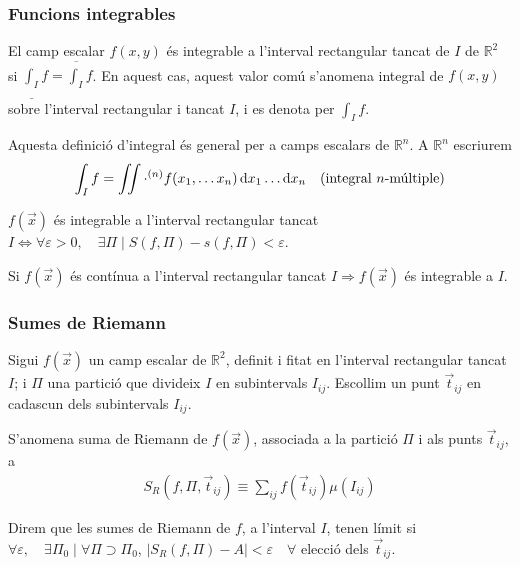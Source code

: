 \subsubsection*{Funcions integrables}
El camp escalar $f(x,y)$ és integrable a l'interval rectangular tancat de $I$ de $\mathbb{R}^{2}$ si $\displaystyle \underline{\int_{I}} f = \overline{\int_{I}} f$. En aquest cas, aquest valor comú s'anomena integral de $f(x,y)$ sobre l'interval rectangular i tancat $I$, i es denota per $\displaystyle \int_{I} f$.

Aquesta definició d'integral és general per a camps escalars de $\mathbb{R}^{n}$. A $\mathbb{R}^{n}$ escriurem
\begin{align}
	\int_{I} f = \iint \cdot^{(n)} f(x_{1}, \dots x_{n}) \mathop{}\!\mathrm{d} x_{1} \dots \mathrm{d} x_{n} \quad \text{(integral $n$-múltiple)}
\end{align}
\begin{thm}
	$f(\vec{x})$ és integrable a l'interval rectangular tancat $I \Leftrightarrow \forall \varepsilon >0, \quad \exists \Pi \mid S(f, \Pi) - s(f, \Pi) < \varepsilon$.
\end{thm}
\begin{cor}
	Si $f(\vec{x})$ és contínua a l'interval rectangular tancat $I \Rightarrow f(\vec{x})$ és integrable a $I$.
\end{cor}

\subsubsection*{Sumes de Riemann}
\begin{defi}
	Sigui $f(\vec{x})$ un camp escalar de $\mathbb{R}^{2}$, definit i fitat en l'interval rectangular tancat $I$; i $\Pi$ una partició que divideix $I$ en subintervals $I_{ij}$. Escollim un punt $\vec{t}_{ij}$ en cadascun dels subintervals $I_{ij}$.

	S'anomena suma de Riemann de $f(\vec{x})$, associada a la partició $\Pi$ i als punts $\vec{t}_{ij}$, a
	\begin{align}
		S_{R} (f, \Pi, \vec{t}_{ij}) \equiv \sum_{ij} f(\vec{t}_{ij}) \mu (I_{ij})
	\end{align}
\end{defi}
Direm que les sumes de Riemann de $f$, a l'interval $I$, tenen límit si $\forall \varepsilon, \quad \exists \Pi_{0} \mid \forall \Pi \supset \Pi_{0}$, $|S_{R}(f, \Pi) - A| < \varepsilon \quad \forall$ elecció dels $\vec{t}_{ij}$.

